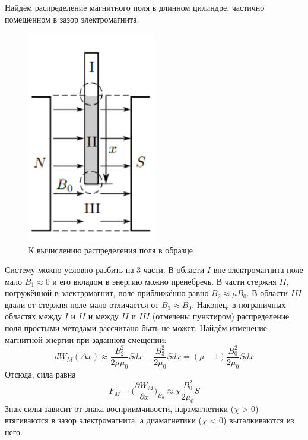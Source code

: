 \documentclass[a4paper,12pt]{article}
\begin{document}
Найдём распределение магнитного поля в длинном цилиндре, частично помещённом в зазор электромагнита.
\begin{figure}\label{fig: расчет силы}
    \begin{center}
    \vspace{-110pt}
        \includegraphics[width = 0.5\textwidth]{Для расчета силы.png}
    \end{center}
    \caption{К вычислению распределения
поля в образце}
\end{figure}

Систему можно условно разбить на 3 части. В области $I$ вне электромагнита поле мало
 $B_1 \approx 0$ и его вкладом в энергию можно пренебречь. В части стержня $II$, погружённой в электромагнит, поле приближённо равно $B_2 \approx \mu B_0$. В области $III$ вдали от стержня поле мало отличается от $B_3 \approx B_0$. Наконец, в пограничных областях между $I$ и $II$ и между $II$ и $III$ (отмечены пунктиром) распределение поля простыми методами рассчитано быть не может. Найдём изменение магнитной энергии при заданном
смещении:
\[dW_M(\Delta x) \approx \frac{B_2^2}{2\mu \mu_0} S dx - \frac{B_3^2}{2\mu_0} S dx = (\mu - 1)\frac{B_0^2}{2\mu_0} S dx\]
Отсюда, сила равна
\[F_M = \Big( \frac{\partial W_M}{\partial x}\Big)_{B_0} \approx \chi \frac{B_0^2}{2\mu_0} S\]
Знак силы зависит от знака восприимчивости, парамагнетики ($\chi$ > 0) втягиваются в зазор электромагнита, а диамагнетики ($\chi$ < 0) выталкиваются из него. 
\end{document}
